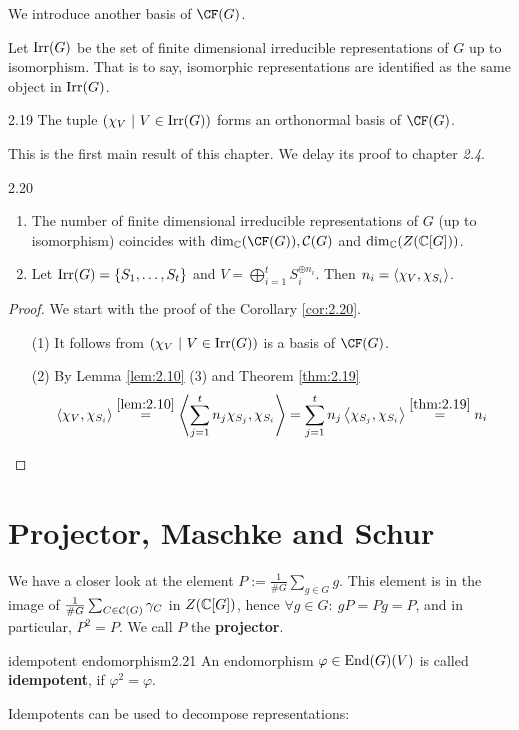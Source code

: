 \documentclass[twoside = false,	%
		headsepline,		%
		parskip = true,
		]{scrbook}						%
\begin{document}
    We introduce another basis of $\CF(G)$.

    Let $\mathrm{Irr}(G)$ be the set of finite dimensional irreducible representations of $G$ up to isomorphism. That is to say, isomorphic representations are identified as the same object in $\mathrm{Irr}(G)$.
    \begin{theorem}{}{2.19}
        The tuple $(\chi_V \ | \ V \in \Irr(G))$ forms an orthonormal basis of $\CF(G)$.
    \end{theorem}
    This is the first main result of this chapter. We delay its proof to chapter \textit{2.4}.

    \begin{corollary}{}{2.20}
        \begin{enumerate}
            \item
                The number of finite dimensional irreducible representations of $G$ (up to isomorphism) coincides with $\dim_\C(\CF(G)), \cC(G)$ and $\dim_\mathbb C(Z(\mathbb C[G]))$.
            \item
                Let $\mathrm{Irr}(G) = \{S_1,\dots,S_t\}$ and $V = \bigoplus_{i=1}^t S_i^{\oplus n_i}$. Then $n_i = \left\langle \chi_V,\chi_{S_i}\right\rangle$.
        \end{enumerate}
    \end{corollary}
    \begin{proof}
        We start with the proof of the Corollary \ref{cor:2.20}.
        \begin{enumerate}
            \item[(1)] It follows from $\left( \chi_V \ | \ V \in \mathrm{Irr}(G)\right)$ is a basis of $\CF(G)$.
            \item[(2)] By Lemma \ref{lem:2.10} (3) and Theorem \ref{thm:2.19}
            \begin{equation*}
                \left\langle \chi_V,\chi_{S_i}\right\rangle \overset{\ref{lem:2.10}}{=} \left\langle \sum_{j=1}^t n_j \chi_{S_j},\chi_{S_i}\right\rangle = \sum_{j=1}^t n_j \left\langle \chi_{S_j},\chi_{S_i}\right\rangle \overset{\ref{thm:2.19}}{=} n_i 
            \end{equation*}
        \end{enumerate}
    \end{proof}

\section{Projector, Maschke and Schur}
    We have a closer look at the element $P:=\frac1{\#G}\sum_{g\in G}g$. This element is in the image of $\frac 1{\#G}\sum_{C\in\mathcal C(G)}\gamma_C$ in $Z(\mathbb C[G])$, hence $\forall g\in G:\ gP=Pg=P$, and in particular, $P^2=P$. We call $P$ the \textbf{projector}.
    \begin{definition}{idempotent endomorphism}{2.21}
        An endomorphism $\varphi\in\mathrm{End}(G)(V)$ is called \textbf{idempotent}, if $\varphi^2=\varphi$.
    \end{definition}
    Idempotents can be used to decompose representations:
\end{document}
